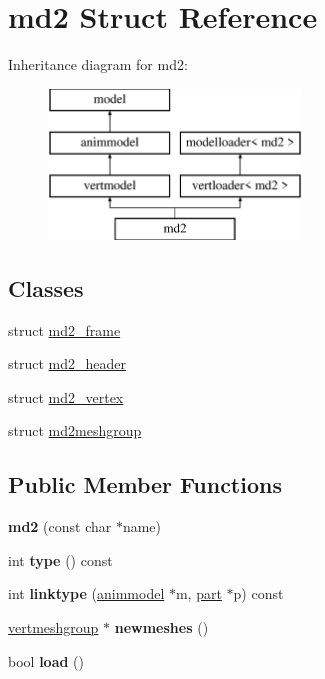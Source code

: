 \hypertarget{structmd2}{}\section{md2 Struct Reference}
\label{structmd2}
Inheritance diagram for md2\+:\begin{figure}[H]
\begin{center}
\leavevmode
\includegraphics[height=4.000000cm]{structmd2}
\end{center}
\end{figure}
\subsection*{Classes}
\begin{DoxyCompactItemize}
\item 
struct \hyperlink{structmd2_1_1md2__frame}{md2\+\_\+frame}
\item 
struct \hyperlink{structmd2_1_1md2__header}{md2\+\_\+header}
\item 
struct \hyperlink{structmd2_1_1md2__vertex}{md2\+\_\+vertex}
\item 
struct \hyperlink{structmd2_1_1md2meshgroup}{md2meshgroup}
\end{DoxyCompactItemize}
\subsection*{Public Member Functions}
\begin{DoxyCompactItemize}
\item 
\mbox{\label{structmd2_ac5a88e91fbc3fd9825273c7352b4eb77}} 
{\bfseries md2} (const char $\ast$name)
\item 
\mbox{\label{structmd2_a44f225514f7fce33e70d7c5080796c96}} 
int {\bfseries type} () const
\item 
\mbox{\label{structmd2_a874aeba7f3531296160a0f78df9b8876}} 
int {\bfseries linktype} (\hyperlink{structanimmodel}{animmodel} $\ast$m, \hyperlink{structanimmodel_1_1part}{part} $\ast$p) const
\item 
\mbox{\label{structmd2_a308e6cc62b0f90105c14a0b387163f0b}} 
\hyperlink{structvertmodel_1_1vertmeshgroup}{vertmeshgroup} $\ast$ {\bfseries newmeshes} ()
\item 
\mbox{\label{structmd2_ac70c2d4ef39512829d05b884d19d81db}} 
bool {\bfseries load} ()
\end{DoxyCompactItemize}
